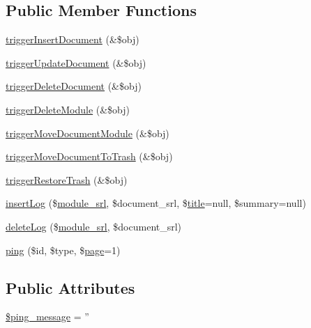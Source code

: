 \subsection*{Public Member Functions}
\begin{DoxyCompactItemize}
\item 
\hyperlink{classsyndicationController_ad83ea21cbde9141ad1c9373da106d70b}{trigger\-Insert\-Document} (\&\$obj)
\item 
\hyperlink{classsyndicationController_ab1f63f345dc61b310321d64ca0e9faf8}{trigger\-Update\-Document} (\&\$obj)
\item 
\hyperlink{classsyndicationController_af80b16891e69e10a006c9bf8d9522785}{trigger\-Delete\-Document} (\&\$obj)
\item 
\hyperlink{classsyndicationController_ad5cee2218bb7097fec5501f4733903be}{trigger\-Delete\-Module} (\&\$obj)
\item 
\hyperlink{classsyndicationController_aadc14b6b5176eaab02d9b6550d272835}{trigger\-Move\-Document\-Module} (\&\$obj)
\item 
\hyperlink{classsyndicationController_aced2755a1175525ac4546f37a8eae905}{trigger\-Move\-Document\-To\-Trash} (\&\$obj)
\item 
\hyperlink{classsyndicationController_ae3e4fadf2712f7d676ad8bb3c6e45d36}{trigger\-Restore\-Trash} (\&\$obj)
\item 
\hyperlink{classsyndicationController_abb80cfc7488695db961efcaeaa0884c8}{insert\-Log} (\$\hyperlink{ko_8install_8php_a370bb6450fab1da3e0ed9f484a38b761}{module\-\_\-srl}, \$document\-\_\-srl, \$\hyperlink{ko_8install_8php_a5b072c5fd1d2228c6ba5cee13cd142e3}{title}=null, \$summary=null)
\item 
\hyperlink{classsyndicationController_a9ce364ad42d643e7c040948c0f17be6a}{delete\-Log} (\$\hyperlink{ko_8install_8php_a370bb6450fab1da3e0ed9f484a38b761}{module\-\_\-srl}, \$document\-\_\-srl)
\item 
\hyperlink{classsyndicationController_a34c1cc51ba4d16b88b0b0135ec6d360f}{ping} (\$id, \$type, \$\hyperlink{classpage}{page}=1)
\end{DoxyCompactItemize}
\subsection*{Public Attributes}
\begin{DoxyCompactItemize}
\item 
\hyperlink{classsyndicationController_a2b46eaf37c125fc974f5bfc4de50e73e}{\$ping\-\_\-message} = ''
\end{DoxyCompactItemize}


